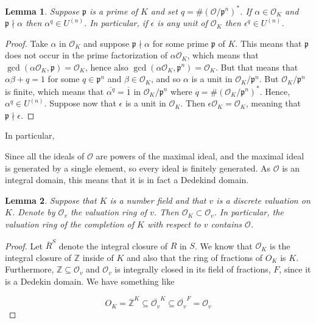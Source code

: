 \documentclass{article}
\newtheorem{lemma}{Lemma}[section]
\newcommand{\mfrak}[1]{\mathfrak{#1}}
\newcommand{\mcal}[1]{\mathcal{#1}}
\newcommand{\mbb}[1]{\mathbb{#1}}
\begin{document}
\begin{lemma}
    Suppose $\mfrak p$ is a prime of $K$ and set $q = \# (\mcal O / \mfrak p^n)^*$. If $\alpha \in \mcal O_K$ and $\mfrak p \nmid \alpha$ then $\alpha^q \in U^{(n)}$. In particular, if $\epsilon$ is any unit of $\mcal O_K$ then $\epsilon^q \in U^{(n)}$.
\end{lemma}
\begin{proof}
    Take $\alpha$ in $\mcal O_K$ and suppose $\mfrak p \nmid \alpha$ for some prime $\mfrak p$ of $K$. This means that $\mfrak p$ does not occur in the prime factorization of $\alpha \mcal O_K$, which means that $\gcd(\alpha \mcal O_K, \mfrak p) = \mcal O_K$, hence also $\gcd(\alpha \mcal O_K, \mfrak p^n) = \mcal O_K$. But that means that $\alpha \beta + q = 1$ for some $q \in \mfrak p^n$ and $\beta \in \mcal O_K$, and so $\alpha$ is a unit in $\mcal O_K / \mfrak p^n$. But $\mcal O_K / \mfrak p^n$ is finite, which means that $\overline{\alpha^q} = \overline 1$ in $\mcal O_K / \mfrak p^n$ where $q = \# (\mcal O_K / \mfrak p^n)^*$. Hence, $\alpha^q \in U^{(n)}$. Suppose now that $\epsilon$ is a unit in $\mcal O_K$. Then $\epsilon \mcal O_K = \mcal O_K$, meaning that $\mfrak p \nmid \epsilon$.  
\end{proof}

In particular, 







Since all the ideals of $\mcal O$ are powers of the maximal ideal, and the maximal ideal is generated by a single element, so every ideal is finitely generated. As $\mcal O$ is an integral domain, this means that it is in fact a Dedekind domain. 

\begin{lemma}
    Suppose that $K$ is a number field and that $v$ is a discrete valuation on $K$. Denote by $\mcal O_v$ the valuation ring of $v$. Then $\mcal O_K \subset \mcal O_v$. In particular, the valuation ring of the completion of $K$ with respect to $v$ contains $\mcal O$.
\end{lemma}

\begin{proof}
    Let $\overline{R}^S$ denote the integral closure of $R$ in $S$. We know that $\mcal O_K$ is the integral closure of $\mbb Z$ inside of $K$ and also that the ring of fractions of $O_K$ is $K$. Furthermore, $\mbb Z \subseteq \mcal O_v$ and $\mcal O_v$ is integrally closed in its field of fractions, $F$, since it is a Dedekin domain. We have something like 

    $$O_K = \overline {\mbb{Z}}^K \subseteq \overline {\mcal O_v}^K \subseteq \overline {\mcal O_v}^F = \mcal O_v$$ 
    
\end{proof}
\end{document}
